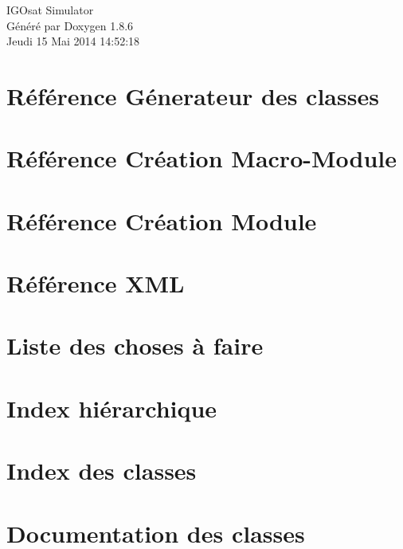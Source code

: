 \documentclass[twoside]{book}
\newcommand{\clearemptydoublepage}{%
  \newpage{\pagestyle{empty}\cleardoublepage}%
}
\begin{document}
\hypersetup{pageanchor=false}
\begin{titlepage}
\vspace*{7cm}
\begin{center}%
{\Large I\-G\-Osat Simulator }\\
\vspace*{1cm}
{\large Généré par Doxygen 1.8.6}\\
\vspace*{0.5cm}
{\small Jeudi 15 Mai 2014 14:52:18}\\
\end{center}
\end{titlepage}
\clearemptydoublepage
\tableofcontents
\clearemptydoublepage
{}
\hypersetup{pageanchor=true}

\chapter{Référence Génerateur des classes}
\label{docGenereateur}
\hypertarget{docGenereateur}{}

\chapter{Référence Création Macro-\/\-Module}
\label{docMacroModule}
\hypertarget{docMacroModule}{}

\chapter{Référence Création Module}
\label{docModule}
\hypertarget{docModule}{}

\chapter{Référence X\-M\-L}
\label{xmlRef}
\hypertarget{xmlRef}{}

\chapter{Liste des choses à faire}
\label{todo}
\hypertarget{todo}{}

\chapter{Index hiérarchique}

\chapter{Index des classes}

\chapter{Documentation des classes}




















\newpage
{}
{}
\printindex
\end{document}
